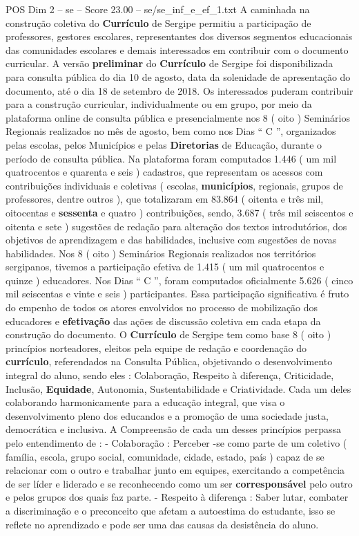 \begin{textsample}{POS Dim 2 – se – Score 23.00 – se/se\_inf\_e\_ef\_1.txt}
A caminhada na construção coletiva do \textbf{Currículo} de Sergipe permitiu a participação de professores, gestores escolares, representantes dos diversos segmentos educacionais das comunidades escolares e demais interessados em contribuir com o documento curricular.
A versão \textbf{preliminar} do \textbf{Currículo} de Sergipe foi disponibilizada para consulta pública do dia 10 de agosto, data da solenidade de apresentação do documento, até o dia 18 de setembro de 2018.
Os interessados puderam contribuir para a construção curricular, individualmente ou em grupo, por meio da plataforma online de consulta pública e presencialmente nos 8 ( oito ) Seminários Regionais realizados no mês de agosto, bem como nos Dias “ C ”, organizados pelas escolas, pelos Municípios e pelas \textbf{Diretorias} de Educação, durante o período de consulta pública.
Na plataforma foram computados 1.446 ( um mil quatrocentos e quarenta e seis ) cadastros, que representam os acessos com contribuições individuais e coletivas ( escolas, \textbf{municípios}, regionais, grupos de professores, dentre outros ), que totalizaram em 83.864 ( oitenta e três mil, oitocentas e \textbf{sessenta} e quatro ) contribuições, sendo, 3.687 ( três mil seiscentos e oitenta e sete ) sugestões de redação para alteração dos textos introdutórios, dos objetivos de aprendizagem e das habilidades, inclusive com sugestões de novas habilidades.
Nos 8 ( oito ) Seminários Regionais realizados nos territórios sergipanos, tivemos a participação efetiva de 1.415 ( um mil quatrocentos e quinze ) educadores.
Nos Dias “ C ”, foram computados oficialmente 5.626 ( cinco mil seiscentas e vinte e seis ) participantes.
Essa participação significativa é fruto do empenho de todos os atores envolvidos no processo de mobilização dos educadores e \textbf{efetivação} das ações de discussão coletiva em cada etapa da construção do documento.
O \textbf{Currículo} de Sergipe tem como base 8 ( oito ) princípios norteadores, eleitos pela equipe de redação e coordenação do \textbf{currículo}, referendados na Consulta Pública, objetivando o desenvolvimento integral do aluno, sendo eles : Colaboração, Respeito à diferença, Criticidade, Inclusão, \textbf{Equidade}, Autonomia, Sustentabilidade e Criatividade.
Cada um deles colaborando harmonicamente para a educação integral, que visa o desenvolvimento pleno dos educandos e a promoção de uma sociedade justa, democrática e inclusiva.
A Compreensão de cada um desses princípios perpassa pelo entendimento de : - Colaboração : Perceber -se como parte de um coletivo ( família, escola, grupo social, comunidade, cidade, estado, país ) capaz de se relacionar com o outro e trabalhar junto em equipes, exercitando a competência de ser líder e liderado e se reconhecendo como um ser \textbf{corresponsável} pelo outro e pelos grupos dos quais faz parte. - Respeito à diferença : Saber lutar, combater a discriminação e o preconceito que afetam a autoestima do estudante, isso se reflete no aprendizado e pode ser uma das causas da desistência do aluno.

\end{textsample}
